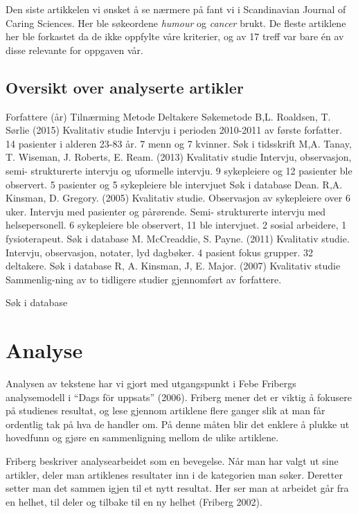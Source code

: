 Den siste artikkelen vi ønsket å se nærmere på fant vi i Scandinavian Journal
of Caring Sciences. Her ble søkeordene \textit{humour} og \textit{cancer}
brukt. De fleste artiklene her ble forkastet da de ikke oppfylte våre
kriterier, og av 17 treff var bare én av disse relevante for oppgaven vår.

\subsection{Oversikt over analyserte artikler}

Forfattere (år)
	Tilnærming
	Metode
	Deltakere
	Søkemetode
	B,L. Roaldsen, T. Sørlie
(2015)
	Kvalitativ studie
	Intervju i perioden 2010-2011 av første forfatter.
	14 pasienter i alderen 23-83 år.
7 menn og 7 kvinner.
	Søk i tidsskrift
	M,A. Tanay, T. Wiseman, J. Roberts, E. Ream. (2013)
	Kvalitativ studie
	Intervju, observasjon, semi-
strukturerte intervju og uformelle intervju.
	9 sykepleiere og 12 pasienter ble observert.
5 pasienter og 5 sykepleiere ble intervjuet
	Søk i database
	Dean. R,A. Kinsman, D. Gregory. (2005)
	Kvalitativ studie.
	Observasjon av sykepleiere over 6 uker. Intervju med pasienter og pårørende. Semi-
strukturerte intervju med helsepersonell.
	6 sykepleiere ble observert, 11 ble intervjuet. 2 sosial arbeidere, 1 fysioterapeut.
	Søk i database
	M. McCreaddie, S. Payne. (2011)
	Kvalitativ studie.
	Intervju, observasjon, notater, lyd dagbøker.
	4 pasient fokus grupper.
32 deltakere.
	Søk i database
	R, A. Kinsman, J, E. Major. (2007)
	Kvalitativ studie
	Sammenlig-ning av to tidligere studier gjennomført av forfattere.

	Søk i database
	
\section{Analyse}

Analysen av tekstene har vi gjort med utgangspunkt i Febe Fribergs
analysemodell i “Dags för uppsats” (2006). Friberg mener det er viktig å
fokusere på studienes resultat, og lese gjennom artiklene flere ganger slik at
man får ordentlig tak på hva de handler om. På denne måten blir det enklere å
plukke ut hovedfunn og gjøre en sammenligning mellom de ulike artiklene.

Friberg beskriver analysearbeidet som en bevegelse. Når man har valgt ut sine
artikler, deler man artiklenes resultater inn i de kategorien man søker.
Deretter setter man det sammen igjen til et nytt resultat. Her ser man at
arbeidet går fra en helhet, til deler og tilbake til en ny helhet (Friberg
2002).

